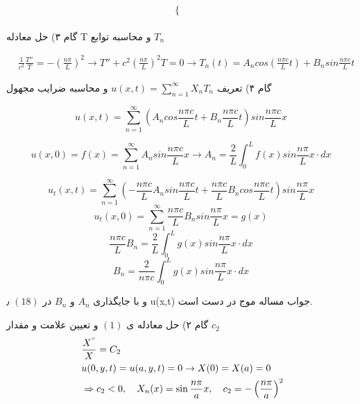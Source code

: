 \begin{problem}
\[\begin{cases}
\end{cases}
\]
\\

گام ۳)
حل معادله T
و محاسبه توابع 
$T_n$

\begin{align*}
&\frac{1}{c^2} \frac{T''}{T} = -(\frac{n \pi}{L})^2
\rightarrow
T'' +  c^2({\frac{n \pi}{L}})^2	T = 0
 \rightarrow
T_n(t) = A_n cos (\frac{n \pi c}{L} t) + B_n sin \frac{n \pi c}{L} t
\end{align*}

گام ۴)
تعریف 
$u(x,t) = \sum_{n=1}^\infty X_n T_n$
و محاسبه ضرایب مجهول

\begin{equation}
	u(x,t) = \sum_{n=1}^\infty 
	(A_n cos \frac {n\pi c}{L}t + B_n \frac {n\pi c}{L}t) sin \frac {n\pi c}{L}x
	\label{eq:5}
\end{equation}

\begin{equation}
	u(x,0) = f(x) =‎‎\sum_{n=1}^{\infty}
	A_n sin \frac {n\pi c}{L}x
	\rightarrow A_n = \frac{2}{L} 
	\int_0^L f(x) sin \frac {n\pi}{L}x \cdot dx
\end{equation}

\begin{equation}
	u_t(x,t) = \sum_{n=1}^{\infty}
	( -\frac{n\pi c }{L} A_n sin \frac {n \pi c}{L}t + \frac {n \pi c}{L} B_n cos \frac {n \pi c}{L}t) sin \frac {n \pi }{L}x
\end{equation}
\begin{equation}
	u_t(x,0) = \sum_{n=1}^{\infty} \frac {n \pi c}{L}B_n sin\frac {n \pi}{L}x = g(x)
\end{equation}
\begin{equation}
	\frac {n \pi c}{L} B_n = \frac{2}{L} \int_0^L g(x) sin \frac {n \pi}{L}x \cdot dx
\end{equation}
\begin{equation}
	B_n = \frac{2}{n\pi c} \int_0^L g(x) sin \frac{n\pi}{L} x \cdot dx
\end{equation}

و با جایگذاری 
$A_n$
و
 $B_n$
 در 
 $(18)$
 ٫ 
 u(x,t)
 جواب مساله موج در دست است.
\end{problem}
گام ۲) حل معادله ی
$(1)$
و تعیین علامت و مقدار 
$c_2$
\begin{equation*}
	\begin{aligned}
		{} &\
		\frac {X^"}{X}=C_2
		\\ &\
		u(0,y,t)=u(a,y,t)=0 \rightarrow X(0)=X(a)=0
		\\ &\
		\Rightarrow c_{2}<0 ,\quad X_{n}(x) = \sin \frac{n \pi}{a} x ,\quad c_{2}=-\left(\frac{n\pi}{a}\right)^{2}
	\end{aligned}
\end{equation*}
